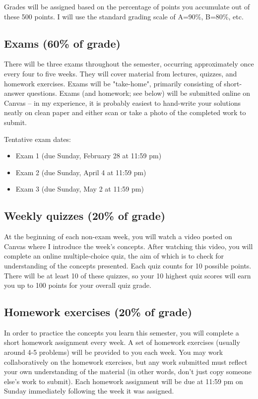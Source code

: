 \documentclass[10pt]{article}
\begin{document}
Grades will be assigned based on the percentage of points you accumulate out of these 500 points.  I will use the standard grading scale of A=90\%, B=80\%, etc.

\subsection*{Exams (60\% of grade)}
\label{sec:orgeb19632}
There will be three exams throughout the semester, occurring approximately once every four to five weeks.  They will cover material from lectures, quizzes, and homework exercises. Exams will be "take-home", primarily consisting of short-answer questions. Exams (and homework; see below) will be submitted online on Canvas -- in my experience, it is probably easiest to hand-write your solutions neatly on clean paper and either scan or take a photo of the completed work to submit. 

Tentative exam dates:

\begin{itemize}
\item Exam 1 (due Sunday, February 28 at 11:59 pm)
\item Exam 2 (due Sunday, April 4 at 11:59 pm)
\item Exam 3 (due Sunday, May 2 at 11:59 pm)
\end{itemize}

\subsection*{Weekly quizzes (20\% of grade)}
\label{sec:orgf357c3b}

At the beginning of each non-exam week, you will watch a video posted on Canvas where I introduce the week's concepts. After watching this video, you will complete an online multiple-choice quiz, the aim of which is to check for understanding of the concepts presented. Each quiz counts for 10 possible points. There will be at least 10 of these quizzes, so your 10 highest quiz scores will earn you up to 100 points for your overall quiz grade.

\subsection*{Homework exercises (20\% of grade)}
\label{sec:org420715c}
In order to practice the concepts you learn this semester, you will complete a short homework assignment every week. A set of homework exercises (usually around 4-5 problems) will be provided to you each week. You may work collaboratively on the homework exercises, but any work submitted must reflect your own understanding of the material (in other words, don't just copy someone else's work to submit).  Each homework assignment will be due at 11:59 pm on Sunday immediately following the week it was assigned.
\end{document}

